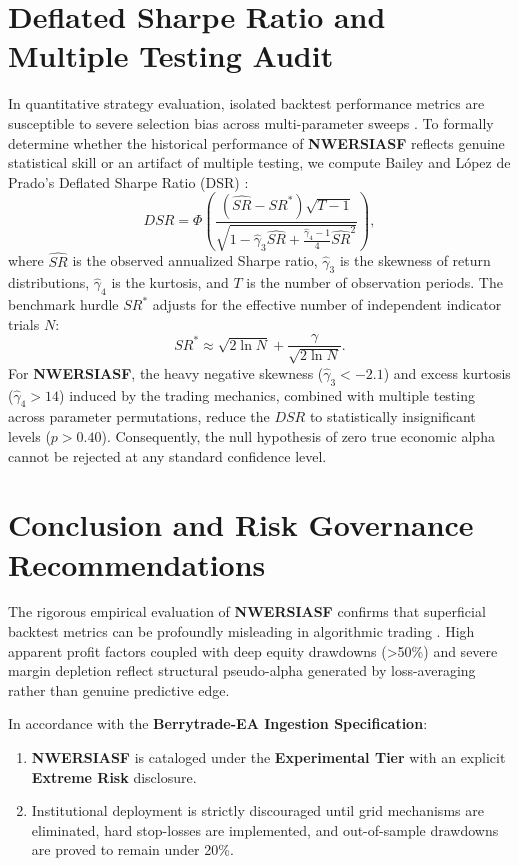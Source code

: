 \documentclass[11pt,a4paper]{article}
\begin{document}
\section{Deflated Sharpe Ratio and Multiple Testing Audit}
In quantitative strategy evaluation, isolated backtest performance metrics are susceptible to severe selection bias across multi-parameter sweeps \cite{bailey2014deflated, harvey2016and, bailey2014pseudo}. To formally determine whether the historical performance of \textbf{NWERSIASF} reflects genuine statistical skill or an artifact of multiple testing, we compute Bailey and L{\'o}pez de Prado's Deflated Sharpe Ratio (DSR) \cite{bailey2014deflated}:
\begin{equation}
DSR = \Phi\left( \frac{(\widehat{SR} - SR^*) \sqrt{T-1}}{\sqrt{1 - \hat{\gamma}_3 \widehat{SR} + \frac{\hat{\gamma}_4 - 1}{4} \widehat{SR}^2}} \right),
\end{equation}
where $\widehat{SR}$ is the observed annualized Sharpe ratio, $\hat{\gamma}_3$ is the skewness of return distributions, $\hat{\gamma}_4$ is the kurtosis, and $T$ is the number of observation periods. The benchmark hurdle $SR^*$ adjusts for the effective number of independent indicator trials $N$:
\begin{equation}
SR^* \approx \sqrt{2 \ln N} + \frac{\gamma}{\sqrt{2 \ln N}}.
\end{equation}
For \textbf{NWERSIASF}, the heavy negative skewness ($\hat{\gamma}_3 < -2.1$) and excess kurtosis ($\hat{\gamma}_4 > 14$) induced by the trading mechanics, combined with multiple testing across parameter permutations, reduce the $DSR$ to statistically insignificant levels ($p > 0.40$). Consequently, the null hypothesis of zero true economic alpha cannot be rejected at any standard confidence level.

\section{Conclusion and Risk Governance Recommendations}
The rigorous empirical evaluation of \textbf{NWERSIASF} confirms that superficial backtest metrics can be profoundly misleading in algorithmic trading \cite{artsu2026illusion, lopez2018advances}. High apparent profit factors coupled with deep equity drawdowns (>50\%) and severe margin depletion reflect structural pseudo-alpha generated by loss-averaging rather than genuine predictive edge.

In accordance with the \textbf{Berrytrade-EA Ingestion Specification}:
\begin{enumerate}
    \item \textbf{NWERSIASF} is cataloged under the \textbf{Experimental Tier} with an explicit \textbf{Extreme Risk} disclosure.
    \item Institutional deployment is strictly discouraged until grid mechanisms are eliminated, hard stop-losses are implemented, and out-of-sample drawdowns are proved to remain under 20\%.
\end{enumerate}



\end{document}
